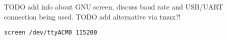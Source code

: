 TODO add info about GNU screen, discuss baud rate and USB/UART connection being used.
TODO add alternative via tmux?!
\begin{lstlisting}
screen /dev/ttyACM0 115200
\end{lstlisting}